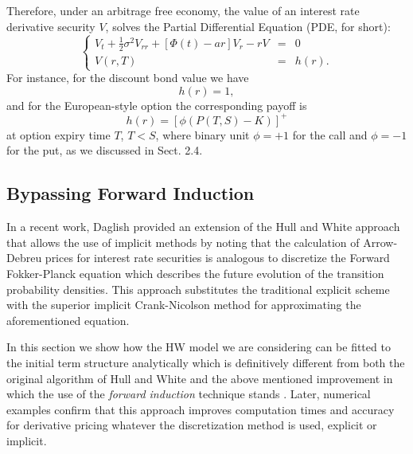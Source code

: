 Therefore, under an arbitrage free economy, the value of an interest
rate derivative security $V$, solves the Partial Differential Equation
(PDE, for short):
\begin{equation}
\left\{
\begin{array}{rcl}
V_t+\frac{1}{2} \sigma^2 V_{rr} +\left[ \Phi(t) - a r \right] V_r - rV &
= &
0 \\
V(r, T)& = & h(r).
\end{array}
\right.
\end{equation}
For instance, for the discount bond value we have 
$$
h(r)=1,
$$ 
and for the European-style option the corresponding payoff is
$$
h(r) = [ \phi (P(T,S)- K)] ^+
$$
at option expiry time $T$, $T<S$, where binary unit $\phi = +1$ for
the call and $\phi = -1$ for the put, as we discussed in Sect. 2.4.

\subsection{Bypassing Forward Induction}
In a recent work, Daglish \cite{D:2010} provided an extension of the
Hull and White \cite{HW:1994} approach that allows the use of implicit
methods by noting that the calculation of Arrow-Debreu prices for
interest rate securities is analogous to discretize the Forward
Fokker-Planck equation which describes the future evolution of the
transition probability densities. This approach substitutes the
traditional explicit scheme with the superior implicit Crank-Nicolson
method for approximating the aforementioned equation. 

In this section we show how the HW model we are considering
can be fitted to the initial term structure analytically which is
definitively different from both the original algorithm of Hull and
White and the above mentioned improvement in which the use of the {\sl
  forward induction} technique stands \cite{J:1991}. Later,
numerical examples confirm that this approach improves computation
times and accuracy for derivative pricing whatever the discretization
method is used, explicit or implicit.

